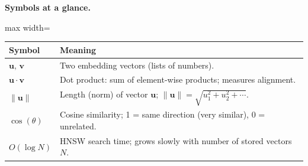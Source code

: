 \documentclass[a4paper,11pt]{article}
\begin{document}
\medskip
\noindent\textbf{Symbols at a glance.}
\begin{center}\small
\begin{adjustbox}{max width=\linewidth}
\begin{tabular}{@{}p{3.0cm}p{9.5cm}@{}}
\toprule
\textbf{Symbol} & \textbf{Meaning} \\
\midrule
$\mathbf{u},\,\mathbf{v}$ & Two embedding vectors (lists of numbers). \\
$\mathbf{u} \cdot \mathbf{v}$ & Dot product: sum of element-wise products; measures alignment. \\
$\|\mathbf{u}\|$ & Length (norm) of vector $\mathbf{u}$;
  $\|\mathbf{u}\| = \sqrt{u_1^2 + u_2^2 + \cdots}$. \\
$\cos(\theta)$ & Cosine similarity; 1 = same direction (very similar), 0 = unrelated. \\
$O(\log N)$ & HNSW search time; grows slowly with number of stored vectors $N$. \\
\bottomrule
\end{tabular}
\end{adjustbox}
\end{center}
\end{document}
